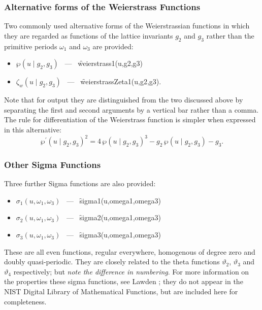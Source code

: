 \subsubsection{Alternative forms of the Weierstrass Functions}
\hypertarget{WEIERSTRASS1}{}
\hypertarget{WEIERSTRASSZETA1}{}
\hypertarget{operator:WEIERSTRASS1}{}
\hypertarget{operator:WEIERSTRASSZETA1}{}
 

Two commonly used alternative forms of the Weierstrassian functions in which
they are regarded as functions of the lattice invariants $g_2$ and $g_3$
rather than the primitive periods $\omega_1$ and $\omega_3$ are provided:
\begin{itemize}
\item  $\wp(u \mid g_2, g_3)$ \ --- \ \f{weierstrass1(u,g2,g3)}
\item $\zeta_w(u \mid g_2, g_3)$ \ --- \ \f{weierstrassZeta1(u,g2,g3)}.
\end{itemize}
Note that for output they are distinguished from the two discussed above
by separating the first and
second arguments by a vertical bar rather than a comma. The rule for
differentiation of the Weierstrass function is simpler when expressed in
this  alternative:
\[ \wp^\prime(u \mid g_2,g_3)^2 = 4\,\wp(u \mid g_2,g_3)^3
   - g_2\, \wp(u \mid g_2,g_3) -g_3. \]

\subsubsection{Other Sigma Functions}
\hypertarget{SIGMA1}{}
\hypertarget{operator:SIGMA1}{}
\hypertarget{operator:SIGMA2}{}
\hypertarget{operator:SIGMA3}{}

Three further Sigma functions are also provided:
  
\begin{itemize}
\item $\sigma_1(u, \omega_1, \omega_3)$ \ --- \ \f{sigma1(u,omega1,omega3)}
\item $\sigma_2(u, \omega_1, \omega_3)$ \ --- \ \f{sigma2(u,omega1,omega3)}
\item $\sigma_3(u, \omega_1, \omega_3)$ \ --- \ \f{sigma3(u,omega1,omega3)}
\end{itemize}
These are all even functions, regular everywhere, homogenous of degree zero and doubly quasi-periodic. They are closely related to the
theta functions $\vartheta_2$, $\vartheta_3$ and $\vartheta_4$ respectively; but \emph{note the difference in numbering}.
For more information on the properties these sigma functions, see Lawden \cite{Lawden:89};
they do not appear in the NIST Digital Library of Mathematical Functions, but are included here for completeness.


